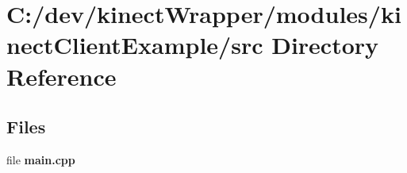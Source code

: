 \section{C\+:/dev/kinect\+Wrapper/modules/kinect\+Client\+Example/src Directory Reference}
\label{dir_451f07972b1bbda26c737cb09edda0a4}
\subsection*{Files}
\begin{DoxyCompactItemize}
\item 
file {\bfseries main.\+cpp}
\end{DoxyCompactItemize}
